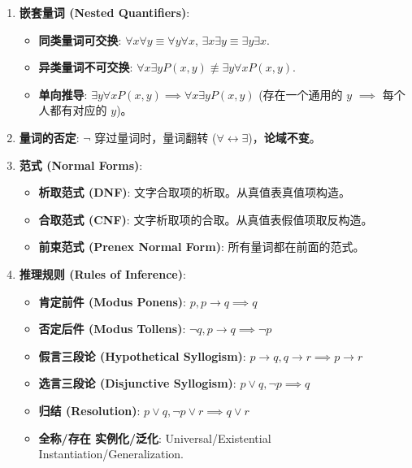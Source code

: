 \documentclass[a4paper,12pt]{ctexart}
\begin{document}
\begin{enumerate}
    \item \textbf{嵌套量词 (Nested Quantifiers)}:
    \begin{itemize}
        \item \textbf{同类量词可交换}: $\forall x \forall y \equiv \forall y \forall x$, $\exists x \exists y \equiv \exists y \exists x$.
        \item \textbf{异类量词不可交换}: $\forall x \exists y P(x, y) \not\equiv \exists y \forall x P(x, y)$.
        \item \textbf{单向推导}: $\exists y \forall x P(x, y) \implies \forall x \exists y P(x, y)$ (存在一个通用的 $y$ $\implies$ 每个人都有对应的 $y$)。
    \end{itemize}

    \item \textbf{量词的否定}: $\neg$ 穿过量词时，量词翻转 ($\forall \leftrightarrow \exists$)，\textbf{论域不变}。

    \item \textbf{范式 (Normal Forms)}:
    \begin{itemize}
        \item \textbf{析取范式 (DNF)}: 文字合取项的析取。从真值表真值项构造。
        \item \textbf{合取范式 (CNF)}: 文字析取项的合取。从真值表假值项取反构造。
        \item \textbf{前束范式 (Prenex Normal Form)}: 所有量词都在前面的范式。
    \end{itemize}

    \item \textbf{推理规则 (Rules of Inference)}:
    \begin{itemize}
        \item \textbf{肯定前件 (Modus Ponens)}: $p, p \to q \implies q$
        \item \textbf{否定后件 (Modus Tollens)}: $\neg q, p \to q \implies \neg p$
        \item \textbf{假言三段论 (Hypothetical Syllogism)}: $p \to q, q \to r \implies p \to r$
        \item \textbf{选言三段论 (Disjunctive Syllogism)}: $p \lor q, \neg p \implies q$
        \item \textbf{归结 (Resolution)}: $p \lor q, \neg p \lor r \implies q \lor r$
        \item \textbf{全称/存在 实例化/泛化}: Universal/Existential Instantiation/Generalization.
    \end{itemize}
\end{enumerate}
\end{document}

